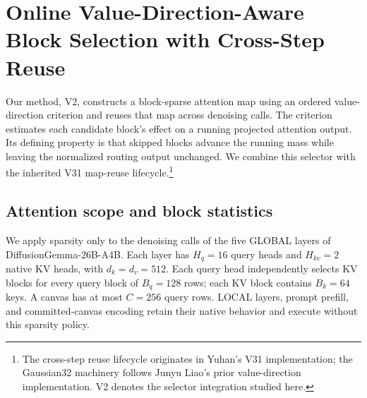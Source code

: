 \documentclass[10pt]{article}
\begin{document}

\section{Online Value-Direction-Aware Block Selection with Cross-Step Reuse}
\label{sec:v2-method}

Our method, V2, constructs a block-sparse attention map using an ordered
value-direction criterion and reuses that map across denoising calls.
The criterion estimates each candidate block's effect on a running projected
attention output. Its defining property is that skipped blocks advance the
running mass while leaving the normalized routing output unchanged.
We combine this selector with the inherited V31 map-reuse lifecycle.\footnote{The
cross-step reuse lifecycle originates in Yuhan's V31 implementation; the
Gaussian32 machinery follows Junyu Liao's prior value-direction implementation.
V2 denotes the selector integration studied here.}

\subsection{Attention scope and block statistics}
\label{sec:v2-statistics}

We apply sparsity only to the denoising calls of the five GLOBAL layers of
DiffusionGemma-26B-A4B. Each layer has $H_q=16$ query heads and $H_{kv}=2$
native KV heads, with $d_k=d_v=512$. Each query head independently selects
KV blocks for every query block of $B_q=128$ rows; each KV block contains
$B_k=64$ keys. A canvas has at most $C=256$ query rows. LOCAL layers,
prompt prefill, and committed-canvas encoding retain their native behavior
and execute without this sparsity policy.
\end{document}
